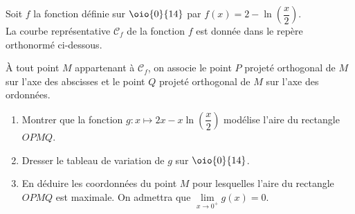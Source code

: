 \documentclass[a4paper,11pt,exos]{nsi} %
\begin{document}
\exo{}
Soit $f$ la fonction définie sur $\oio{0}{14}$ par $f(x)=2-\ln \left(\dfrac{x}{2}\right)$.\\[.5em]
La courbe représentative $\mathcal{C}_f$ de la fonction $f$ est donnée dans le repère orthonormé ci-dessous.
\begin{center}
    \def\xmin{-1} \def\ymin{-1}\def\xmax{15}\def\ymax{5}
\end{center}
À tout point $M$ appartenant à $\mathcal{C}_f$, on associe le point $P$ projeté orthogonal de $M$ sur l'axe des abscisses et le point $Q$ projeté orthogonal de $M$ sur l'axe des ordonnées.
\begin{enumerate}
    \item Montrer que la fonction $g:x\mapsto 2x-x\ln \left(\dfrac{x}{2}\right)$ modélise l'aire du rectangle $OPMQ$.
    \item Dresser le tableau de variation de $g$ sur $\oio{0}{14}$.
    \item En déduire les coordonnées du point $M$ pour lesquelles l'aire du rectangle $OPMQ$ est maximale.
    On admettra que $\lim\limits_{x\to 0^+} g(x)=0$.
\end{enumerate}
\end{document}
